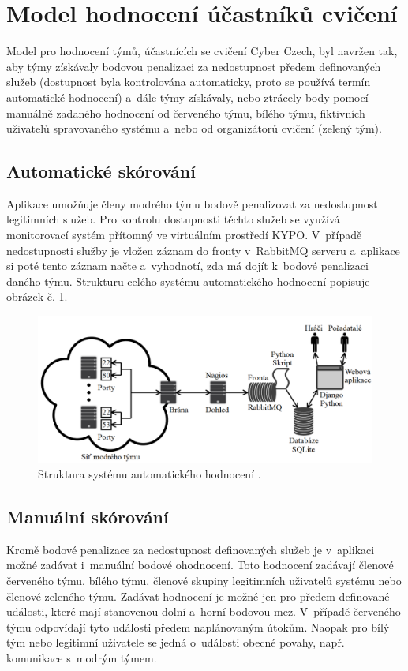 \documentclass[
  digital,
  twoside,
  table, 
  nolof, 
  nolot
]{fithesis3}
\begin{document}
\section{Model hodnocení účastníků cvičení}
Model pro hodnocení týmů, účastnících se cvičení Cyber Czech, byl navržen tak, aby týmy získávaly bodovou penalizaci za nedostupnost předem definovaných služeb (dostupnost byla kontrolována automaticky, proto se používá termín automatické hodnocení) a~dále týmy získávaly, nebo ztrácely body pomocí manuálně zadaného hodnocení od červeného týmu, bílého týmu, fiktivních uživatelů spravovaného systému a~nebo od organizátorů cvičení (zelený tým).

\subsection{Automatické skórování}
Aplikace umožňuje členy modrého týmu bodově penalizovat za nedostupnost legitimních služeb. Pro kontrolu dostupnosti těchto služeb se využívá monitorovací systém přítomný ve virtuálním prostředí KYPO. V~případě nedostupnosti služby je vložen záznam do fronty v~RabbitMQ \cite{rabitmq} serveru a~aplikace si poté tento záznam načte a~vyhodnotí, zda má dojít k~bodové penalizaci daného týmu. Strukturu celého systému automatického hodnocení popisuje obrázek č. \ref{fig:autoScoring}.

\begin{figure}[h!]
    \centering
    \includegraphics[width=13cm]{images/Page-47-Image-27.png}
    \caption{Struktura systému automatického hodnocení \cite{Kostelnik2016thesis}.}
    \label{fig:autoScoring}
\end{figure}

\subsection{Manuální skórování}
Kromě bodové penalizace za nedostupnost definovaných služeb je v~aplikaci možné zadávat i~manuální bodové ohodnocení. Toto hodnocení zadávají členové červeného týmu, bílého týmu, členové skupiny legitimních uživatelů systému nebo členové zeleného týmu. Zadávat hodnocení je možné jen pro předem definované události, které mají stanovenou dolní a~horní bodovou mez. V~případě červeného týmu odpovídají tyto události předem naplánovaným útokům. Naopak pro bílý tým nebo legitimní uživatele se jedná o~události obecné povahy, např. komunikace s~modrým týmem.
\end{document}
